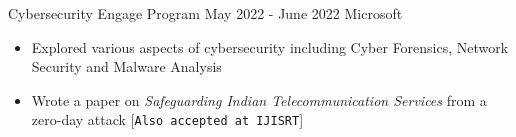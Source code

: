 \excventry
{Cybersecurity Engage Program}
{May 2022 - June 2022}
{Microsoft}
{
  \begin{itemize}
    \item Explored various aspects of cybersecurity including Cyber Forensics, Network Security and Malware Analysis
    \item Wrote a paper on \textit{Safeguarding Indian Telecommunication Services} from a zero-day attack [\texttt{Also accepted at IJISRT}]
  \end{itemize}
}

